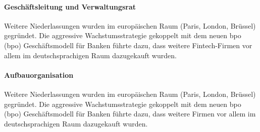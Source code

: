 \paragraph*{Geschäftsleitung und Verwaltungsrat}\mbox{}
\begin{sloppypar}
Weitere Niederlassungen wurden im europäischen Raum (Paris, London, Brüssel) gegründet. Die aggressive Wachstumsstrategie gekoppelt mit dem neuen \acrshort{bpo} (\acrlong{bpo}) Geschäftsmodell für Banken führte dazu, dass weitere Fintech-Firmen vor allem im deutschsprachigen Raum dazugekauft wurden.
\end{sloppypar}

\paragraph*{Aufbauorganisation}\mbox{} 

\begin{sloppypar}
Weitere Niederlassungen wurden im europäischen Raum (Paris, London, Brüssel) gegründet. Die aggressive Wachstumsstrategie gekoppelt mit dem neuen \acrshort{bpo} (\acrlong{bpo}) Geschäftsmodell für Banken führte dazu, dass weitere Firmen vor allem im deutschsprachigen Raum dazugekauft wurden.
\end{sloppypar}
